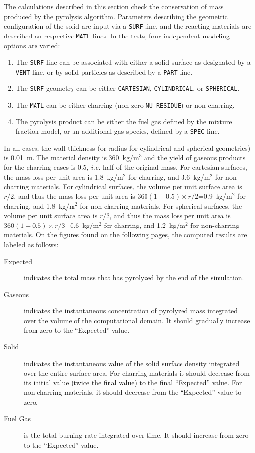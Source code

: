 \documentclass[11pt]{book}
\newcommand{\ct}{\tt\small}
\begin{document}
The calculations described in this section check the conservation of
mass produced by the pyrolysis algorithm. Parameters describing the geometric configuration of the solid are input via a {\ct SURF} line,  and
the reacting materials are described on respective {\ct MATL} lines. In the tests, four independent modeling options are varied:
\begin{enumerate}
\item The {\ct SURF} line can be associated with either a solid surface as designated by a {\ct VENT} line, or by solid particles as
described by a {\ct PART} line.
\item The {\ct SURF} geometry can be either {\ct CARTESIAN}, {\ct CYLINDRICAL}, or {\ct SPHERICAL}.
\item The {\ct MATL} can be either charring (non-zero {\ct NU\_RESIDUE}) or non-charring.
\item The pyrolysis product can be either the fuel gas defined by the
mixture fraction model, or an additional gas species, defined by a {\ct SPEC} line.
\end{enumerate}
In all cases, the wall thickness (or radius for cylindrical and spherical geometries) is 0.01~m. The material density is 360~kg/m$^3$ and the yield of gaseous
products for the charring cases is 0.5, {\em i.e.} half of the original mass. For cartesian surfaces, the mass loss per unit area is
1.8~kg/m$^2$ for charring, and 3.6~kg/m$^2$ for non-charring materials.
For cylindrical surfaces, the volume per unit surface area is $r/2$, and thus the mass loss per unit area
is $360(1-0.5) \times r/2$=0.9~kg/m$^2$ for charring, and 1.8~kg/m$^2$ for non-charring materials.
For spherical surfaces, the volume per unit surface area is $r/3$, and thus the mass loss per unit area is
$360(1-0.5) \times r/3$=0.6~kg/m$^2$ for charring, and 1.2~kg/m$^2$ for non-charring materials.
On the figures found on the following pages, the computed results are labeled as follows:
\begin{description}
\item[Expected] indicates the total mass that has pyrolyzed by the end of the simulation.
\item[Gaseous] indicates the instantaneous concentration of pyrolyzed mass integrated over the volume of the
computational domain. It should gradually increase from zero to the ``Expected'' value.
\item[Solid] indicates the instantaneous value of the solid surface density integrated over the entire surface area.
For charring materials it should decrease from its initial value (twice the final value) to the final ``Expected'' value. For non-charring materials, it should
decrease from the ``Expected'' value to zero.
\item[Fuel Gas] is the total burning rate integrated over time. It should increase from zero to the ``Expected'' value.
\end{description}
\end{document}
